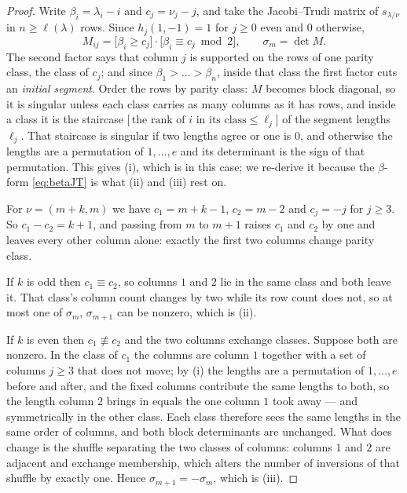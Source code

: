 \documentclass[11pt,reqno]{amsart}
\theoremstyle{plain}
\theoremstyle{definition}
\begin{document}
\begin{proof}
Write $\beta_i=\lambda_i-i$ and $c_j=\nu_j-j$, and take the Jacobi--Trudi matrix of
$s_{\lambda/\nu}$ in $n\ge\ell(\lambda)$ rows. Since $h_j(1,-1)=1$ for $j\ge0$ even and $0$
otherwise,
\begin{equation}\label{eq:betaJT}
M_{ij}=\bigl[\beta_i\ge c_j\bigr]\cdot\bigl[\beta_i\equiv c_j \bmod 2\bigr],\qquad
\sigma_m=\det M .
\end{equation}
The second factor says that column $j$ is supported on the rows of one parity class, the class of
$c_j$; and since $\beta_1>\dots>\beta_n$, inside that class the first factor cuts an \emph{initial
segment}. Order the rows by parity class: $M$ becomes block diagonal, so it is singular unless each
class carries as many columns as it has rows, and inside a class it is the staircase
$\bigl[\,\text{the rank of }i\text{ in its class}\le\ell_j\bigr]$ of the segment lengths $\ell_j$. That staircase is singular if two
lengths agree or one is $0$, and otherwise the lengths are a permutation of $1,\dots,e$ and its
determinant is the sign of that permutation. This gives (i), which is \cite[p.~91]{Mac95} in this
case; we re-derive it because the $\beta$-form \eqref{eq:betaJT} is what (ii) and (iii) rest on.

For $\nu=(m+k,m)$ we have $c_1=m+k-1$, $c_2=m-2$ and $c_j=-j$ for $j\ge3$. So $c_1-c_2=k+1$, and
passing from $m$ to $m+1$ raises $c_1$ and $c_2$ by one and leaves every other column alone: exactly
the first two columns change parity class.

If $k$ is odd then $c_1\equiv c_2$, so columns $1$ and $2$ lie in the same class and both leave it.
That class's column count changes by two while its row count does not, so at most one of $\sigma_m$,
$\sigma_{m+1}$ can be nonzero, which is (ii).

If $k$ is even then $c_1\not\equiv c_2$ and the two columns exchange classes. Suppose both are
nonzero. In the class of $c_1$ the columns are column $1$ together with a set of columns $j\ge3$
that does not move; by (i) the lengths are a permutation of $1,\dots,e$ before and after, and the
fixed columns contribute the same lengths to both, so the length column $2$ brings in equals the one
column $1$ took away --- and symmetrically in the other class. Each class therefore sees the same
lengths in the same order of columns, and both block determinants are unchanged. What does change is
the shuffle separating the two classes of columns: columns $1$ and $2$ are adjacent and exchange
membership, which alters the number of inversions of that shuffle by exactly one. Hence
$\sigma_{m+1}=-\sigma_m$, which is (iii).
\end{proof}
\end{document}

